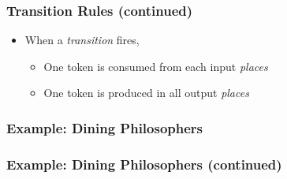 \begin{frame}
    \frametitle{Transition Rules (continued)}
    \begin{itemize}
        \item{When a \emph{transition} fires,
            \begin{itemize}
                \item{One token is consumed from each input \emph{places}}
                \item{One token is produced in all output \emph{places}}
            \end{itemize}}
    \end{itemize}
    \begin{figure}
        \centering
        \tikzset{node distance = 0.5cm and 0.5cm}
        \intropetrinet[red][black][0.5]{}
        \intropetrinetnext[red][black][0.5]{}
    \end{figure}
\end{frame}

\begin{frame}
    \frametitle{Example: Dining Philosophers}
    \begin{figure}
        \centering
        \tikzset{node distance = 1.0cm and 1.0cm}
        \diningphilos{}
    \end{figure}
\end{frame}
\begin{frame}
    \frametitle{Example: Dining Philosophers (continued)}
    \begin{figure}
        \centering
        \tikzset{node distance = 1.0cm and 1.0cm}
        \diningphilosnext{}
    \end{figure}
\end{frame}
